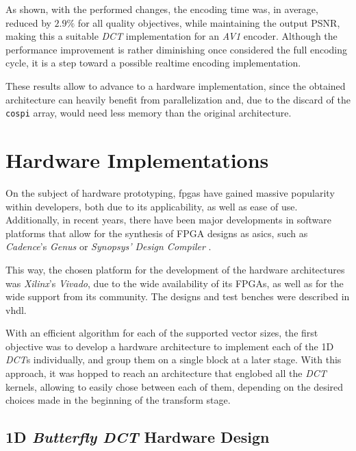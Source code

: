 As shown, with the performed changes, the encoding time was, in average, reduced by $2.9\%$ for all quality objectives, while maintaining the output PSNR, making this a suitable \emph{DCT} implementation for an \emph{AV1} encoder. Although the performance improvement is rather diminishing once considered the full encoding cycle, it is a step toward a possible realtime encoding implementation.

These results allow to advance to a hardware implementation, since the obtained architecture can heavily benefit from parallelization and, due to the discard of the \texttt{cospi} array, would need less memory than the original architecture.

\section{Hardware Implementations}

On the subject of hardware prototyping, \glspl{fpga} have gained massive popularity within developers, both due to its applicability, as well as ease of use. Additionally, in recent years, there have been major developments in software platforms that allow for the synthesis of FPGA designs as \glspl{asic}, such as \emph{Cadence}'s \emph{Genus} or \emph{Synopsys' Design Compiler} \cite{GenusSynthesisSolution, DesignCompilerGraphical}. 

This way, the chosen platform for the development of the hardware architectures was \emph{Xilinx}'s \emph{Vivado}, due to the wide availability of its FPGAs, as well as for the wide support from its community. The designs and test benches were described in \gls{vhdl}.

With an efficient algorithm for each of the supported vector sizes, the first objective was to develop a hardware architecture to implement each of the 1D \emph{DCT}s individually, and group them on a single block at a later stage. With this approach, it was hopped to reach an architecture that englobed all the \emph{DCT} kernels, allowing to easily chose between each of them, depending on the desired choices made in the beginning of the transform stage.

\subsection{1D \emph{Butterfly DCT} Hardware Design}

